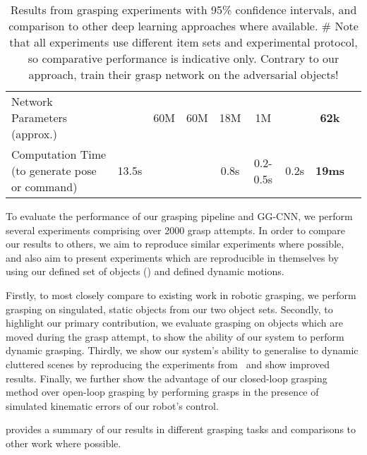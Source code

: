 \documentclass[conference]{IEEEtran}
\begin{document}
\begin{table*}[t!]
\begin{center}
\begin{tabular}{@{}lcccccccc@{}}
        \midrule
        Network Parameters (approx.)      &       & 60M   & 60M  & 18M  & 1M  &      & \textbf{62k} \\
        Computation Time (to generate pose or command) & 13.5s &       &      & 0.8s & 0.2-0.5s & 0.2s & \textbf{19ms} \\
        \bottomrule
        \end{tabular}
    
        \vspace{2mm}
        \caption{Results from grasping experiments with 95\% confidence intervals, and comparison to other deep learning approaches where available. \newline \# Note that all experiments use different item sets and experimental protocol, so comparative performance is indicative only. \newline *Contrary to our approach, \cite{Mahler2017Dex2} train their grasp network on the adversarial objects! }
        \label{tab:results}
        \vspace{-8mm}
    \end{center}
    
\end{table*}

To evaluate the performance of our grasping pipeline and GG-CNN, we perform several experiments comprising over 2000 grasp attempts.  In order to compare our results to others, we aim to reproduce similar experiments where possible, and also aim to present experiments which are reproducible in themselves by using our defined set of objects () and defined dynamic motions.  

Firstly, to most closely compare to existing work in robotic grasping, we perform grasping on singulated, static objects from our two object sets.  Secondly, to highlight our primary contribution, we evaluate grasping on objects which are moved during the grasp attempt, to show the ability of our system to perform dynamic grasping.  Thirdly, we show our system's ability to generalise to dynamic cluttered scenes by reproducing the experiments from~\cite{Viereck2017LearningImages} and show improved results.  Finally, we further show the advantage of our closed-loop grasping method over open-loop grasping by performing grasps in the presence of simulated kinematic errors of our robot's control.  

 provides a summary of our results in different grasping tasks and comparisons to other work where possible.
\end{document}
